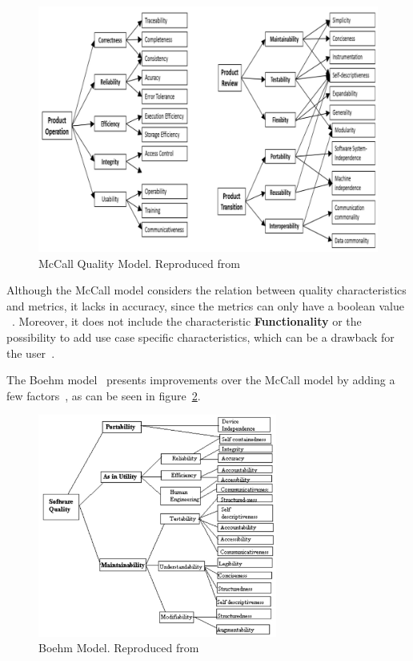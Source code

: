 \begin{figure}[h!]
\centering
\includegraphics{images/mccall.jpg}
\caption{McCall Quality Model. Reproduced from~\cite{quality_models}}
\label{image_mccall}
\end{figure}

Although the McCall model considers the relation between quality
characteristics and metrics, it lacks in accuracy, since the metrics can
only have a boolean value ~\cite{quality_models}. Moreover, it does not include the
characteristic \textbf{Functionality} or the possibility to add use case
specific characteristics, which can be a drawback for the user~\cite{quality_models}.

The Boehm model~\cite{boehm} presents improvements over the McCall model by adding a
few factors~\cite{quality_models}, as can be seen in figure~\ref{image_boehm}.

\begin{figure}[h!]
\centering
\includegraphics[width=0.7\textwidth]{images/boehm.jpg}
\caption{Boehm Model. Reproduced from~\cite{quality_models}}
    \label{image_boehm}
\end{figure}

